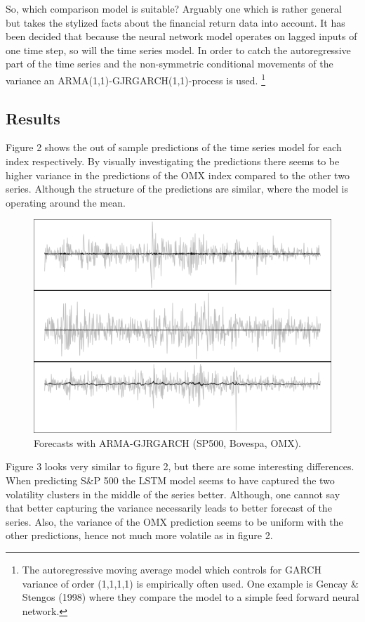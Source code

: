\documentclass[12pt, letterpaper]{amsart}%
\begin{document}
So, which comparison model is suitable? Arguably one which is rather general but takes the stylized facts about the financial return data into account. It has been decided that because the neural network model operates on lagged inputs of one time step, so will the time series model. In order to catch the autoregressive part of the time series and the non-symmetric conditional movements of the variance an ARMA(1,1)-GJRGARCH(1,1)-process is used. \footnote{The autoregressive moving average model which controls for GARCH variance of order (1,1,1,1) is empirically often used. One example is Gencay \& Stengos (1998) where they compare the model to a simple feed forward neural network.}

\subsection{Results}
Figure 2 shows the out of sample predictions of the time series model for each index respectively. By visually investigating the predictions there seems to be higher variance in the predictions of the OMX index compared to the other two series. Although the structure of the predictions are similar, where the model is operating around the mean.


\begin{figure}[H]
\caption{Forecasts with ARMA-GJRGARCH (SP500, Bovespa, OMX).}
\centering
\includegraphics[scale=0.5]{garch_pred.png}
\end{figure}

Figure 3 looks very similar to figure 2, but there are some interesting differences. When predicting S\&P 500 the LSTM model seems to have captured the two volatility clusters in the middle of the series better. Although, one cannot say that better capturing the variance necessarily leads to better forecast of the series. Also, the variance of the OMX prediction seems to be uniform with the other predictions, hence not much more volatile as in figure 2.
\end{document}
